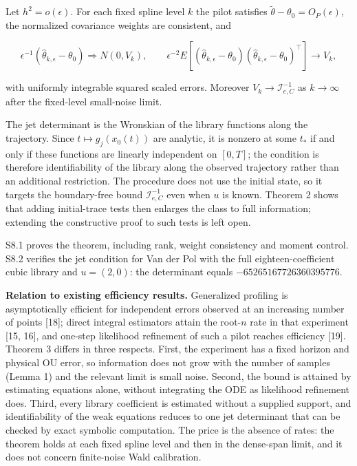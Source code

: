 \documentclass[ejs]{imsart}
\begin{document}
Let \(h^2=o(\epsilon)\). For each fixed spline level \(k\) the pilot
satisfies \(\widetilde\theta-\theta_0=O_P(\epsilon)\), the normalized
covariance weights are consistent, and

\[
\epsilon^{-1}(\widehat\theta_{k,\epsilon}-\theta_0)\Rightarrow N(0,V_k),\qquad
\epsilon^{-2}E[(\widehat\theta_{k,\epsilon}-\theta_0)(\widehat\theta_{k,\epsilon}-\theta_0)^\top]\to V_k,
\]

with uniformly integrable squared scaled errors. Moreover
\(V_k\to\mathcal I_{e,C}^{-1}\) as \(k\to\infty\) after the fixed-level
small-noise limit.

The jet determinant is the Wronskian of the library functions along the
trajectory. Since \(t\mapsto g_j(x_0(t))\) are analytic, it is nonzero
at some \(t_*\) if and only if these functions are linearly independent
on \([0,T]\); the condition is therefore identifiability of the library
along the observed trajectory rather than an additional restriction. The
procedure does not use the initial state, so it targets the
boundary-free bound \(\mathcal I_{e,C}^{-1}\) even when \(u\) is known.
Theorem 2 shows that adding initial-trace tests then enlarges the class
to full information; extending the constructive proof to such tests is
left open.

S8.1 proves the theorem, including rank, weight consistency and moment
control. S8.2 verifies the jet condition for Van der Pol with the full
eighteen-coefficient cubic library and \(u=(2,0)\): the determinant
equals \(-65265167726360395776\).

\textbf{Relation to existing efficiency results.} Generalized profiling
is asymptotically efficient for independent errors observed at an
increasing number of points {[}18{]}; direct integral estimators attain
the root-\(n\) rate in that experiment {[}15, 16{]}, and one-step
likelihood refinement of such a pilot reaches efficiency {[}19{]}.
Theorem 3 differs in three respects. First, the experiment has a fixed
horizon and physical OU error, so information does not grow with the
number of samples (Lemma 1) and the relevant limit is small noise.
Second, the bound is attained by estimating equations alone, without
integrating the ODE as likelihood refinement does. Third, every library
coefficient is estimated without a supplied support, and identifiability
of the weak equations reduces to one jet determinant that can be checked
by exact symbolic computation. The price is the absence of rates: the
theorem holds at each fixed spline level and then in the dense-span
limit, and it does not concern finite-noise Wald calibration.
\end{document}
